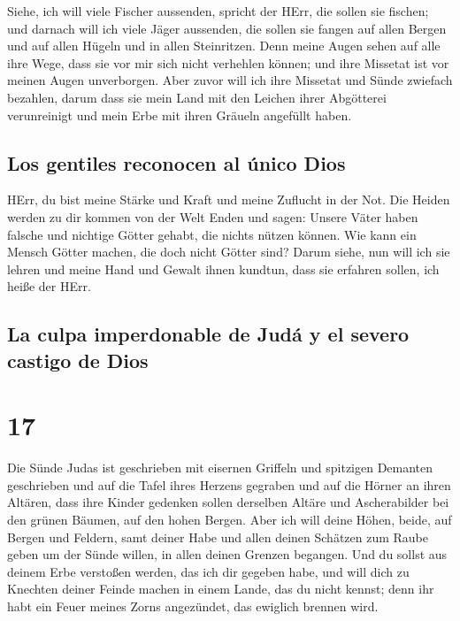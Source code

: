  Siehe, ich will viele Fischer aussenden, spricht der
HErr, die sollen sie fischen; und darnach will ich viele Jäger
aussenden, die sollen sie fangen auf allen Bergen und auf allen Hügeln
und in allen Steinritzen.  Denn meine Augen sehen auf
alle ihre Wege, dass sie vor mir sich nicht verhehlen können; und ihre
Missetat ist vor meinen Augen unverborgen.  Aber zuvor
will ich ihre Missetat und Sünde zwiefach bezahlen, darum dass sie mein
Land mit den Leichen ihrer Abgötterei verunreinigt und mein Erbe mit
ihren Gräueln angefüllt haben.

\hypertarget{los-gentiles-reconocen-al-uxfanico-dios}{%
\subsection{Los gentiles reconocen al único
Dios}\label{los-gentiles-reconocen-al-uxfanico-dios}}

 HErr, du bist meine Stärke und Kraft und meine Zuflucht
in der Not. Die Heiden werden zu dir kommen von der Welt Enden und
sagen: Unsere Väter haben falsche und nichtige Götter gehabt, die nichts
nützen können.  Wie kann ein Mensch Götter machen, die
doch nicht Götter sind?  Darum siehe, nun will ich sie
lehren und meine Hand und Gewalt ihnen kundtun, dass sie erfahren
sollen, ich heiße der HErr.

\hypertarget{la-culpa-imperdonable-de-juduxe1-y-el-severo-castigo-de-dios}{%
\subsection{La culpa imperdonable de Judá y el severo castigo de
Dios}\label{la-culpa-imperdonable-de-juduxe1-y-el-severo-castigo-de-dios}}

\hypertarget{section-16}{%
\section{17}\label{section-16}}

 Die Sünde Judas ist geschrieben mit eisernen Griffeln und
spitzigen Demanten geschrieben und auf die Tafel ihres Herzens gegraben
und auf die Hörner an ihren Altären,  dass ihre Kinder
gedenken sollen derselben Altäre und Ascherabilder bei den grünen
Bäumen, auf den hohen Bergen.  Aber ich will deine Höhen,
beide, auf Bergen und Feldern, samt deiner Habe und allen deinen
Schätzen zum Raube geben um der Sünde willen, in allen deinen Grenzen
begangen.  Und du sollst aus deinem Erbe verstoßen werden,
das ich dir gegeben habe, und will dich zu Knechten deiner Feinde machen
in einem Lande, das du nicht kennst; denn ihr habt ein Feuer meines
Zorns angezündet, das ewiglich brennen wird.

